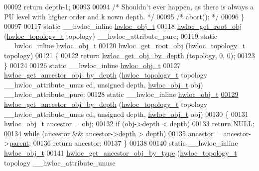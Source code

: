 \begin{DoxyCode}
00092       \textcolor{keywordflow}{return} depth-1;
00093 
00094   \textcolor{comment}{/* Shouldn't ever happen, as there is always a PU level with higher order and k
      nown depth.  */}
00095   \textcolor{comment}{/* abort(); */}
00096 \}
00097 
00117 \textcolor{keyword}{static} \_\_hwloc\_inline \hyperlink{a00016}{hwloc_obj_t}
00118 \hyperlink{a00053_gadbf58f6e187efbdb3cd9a8e30311b7d7}{hwloc_get_root_obj} (\hyperlink{a00039_ga9d1e76ee15a7dee158b786c30b6a6e38}{hwloc_topology_t} topology) \_\_hwloc\_attribute\_pure;
00119 \textcolor{keyword}{static} \_\_hwloc\_inline \hyperlink{a00016}{hwloc_obj_t}
\hypertarget{a00031_source_l00120}{}\hyperlink{a00053_gadbf58f6e187efbdb3cd9a8e30311b7d7}{00120} \hyperlink{a00053_gadbf58f6e187efbdb3cd9a8e30311b7d7}{hwloc_get_root_obj} (\hyperlink{a00039_ga9d1e76ee15a7dee158b786c30b6a6e38}{hwloc_topology_t} topology)
00121 \{
00122   \textcolor{keywordflow}{return} \hyperlink{a00047_gaedd78240b0c1108355586a268ec5a697}{hwloc_get_obj_by_depth} (topology, 0, 0);
00123 \}
00124 
00126 \textcolor{keyword}{static} \_\_hwloc\_inline \hyperlink{a00016}{hwloc_obj_t}
00127 \hyperlink{a00053_ga9b9d6af74eb0b78b1384aa66dd058ddc}{hwloc_get_ancestor_obj_by_depth} (\hyperlink{a00039_ga9d1e76ee15a7dee158b786c30b6a6e38}{hwloc_topology_t} topology \_\_hwloc\_attribute\_unus
      ed, \textcolor{keywordtype}{unsigned} depth, \hyperlink{a00016}{hwloc_obj_t} obj) \_\_hwloc\_attribute\_pure;
00128 \textcolor{keyword}{static} \_\_hwloc\_inline \hyperlink{a00016}{hwloc_obj_t}
\hypertarget{a00031_source_l00129}{}\hyperlink{a00053_ga9b9d6af74eb0b78b1384aa66dd058ddc}{00129} \hyperlink{a00053_ga9b9d6af74eb0b78b1384aa66dd058ddc}{hwloc_get_ancestor_obj_by_depth} (\hyperlink{a00039_ga9d1e76ee15a7dee158b786c30b6a6e38}{hwloc_topology_t} topology \_\_hwloc\_attribute\_unus
      ed, \textcolor{keywordtype}{unsigned} depth, \hyperlink{a00016}{hwloc_obj_t} obj)
00130 \{
00131   \hyperlink{a00016}{hwloc_obj_t} ancestor = obj;
00132   \textcolor{keywordflow}{if} (obj->\hyperlink{a00016_a9d82690370275d42d652eccdea5d3ee5}{depth} < depth)
00133     \textcolor{keywordflow}{return} NULL;
00134   \textcolor{keywordflow}{while} (ancestor && ancestor->\hyperlink{a00016_a9d82690370275d42d652eccdea5d3ee5}{depth} > depth)
00135     ancestor = ancestor->\hyperlink{a00016_adc494f6aed939992be1c55cca5822900}{parent};
00136   \textcolor{keywordflow}{return} ancestor;
00137 \}
00138 
00140 \textcolor{keyword}{static} \_\_hwloc\_inline \hyperlink{a00016}{hwloc_obj_t}
00141 \hyperlink{a00053_gac93e1a95a71add57ac841daef1b94e5e}{hwloc_get_ancestor_obj_by_type} (\hyperlink{a00039_ga9d1e76ee15a7dee158b786c30b6a6e38}{hwloc_topology_t} topology \_\_hwloc\_attribute\_unuse

\end{DoxyCode}
